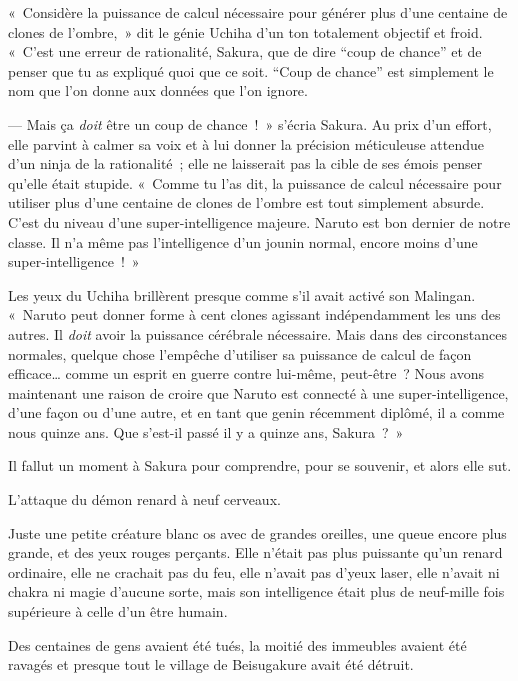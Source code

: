 \clearpage
{}

«~Considère la puissance de calcul nécessaire pour générer plus d'une centaine de clones de l'ombre,~» dit le génie Uchiha d'un ton totalement objectif et froid. «~C'est une erreur de rationalité, Sakura, que de dire “coup de chance” et de penser que tu as expliqué quoi que ce soit. “Coup de chance” est simplement le nom que l'on donne aux données que l'on ignore.

--- Mais ça \emph{doit} être un coup de chance~!~» s'écria Sakura. Au prix d'un effort, elle parvint à calmer sa voix et à lui donner la précision méticuleuse attendue d'un ninja de la rationalité~; elle ne laisserait pas la cible de ses émois penser qu'elle était stupide. «~Comme tu l'as dit, la puissance de calcul nécessaire pour utiliser plus d'une centaine de clones de l'ombre est tout simplement absurde. C'est du niveau d'une super-intelligence majeure. Naruto est bon dernier de notre classe. Il n'a même pas l'intelligence d'un jounin normal, encore moins d'une super-intelligence~!~»

Les yeux du Uchiha brillèrent presque comme s'il avait activé son Malingan. «~Naruto peut donner forme à cent clones agissant indépendamment les uns des autres. Il \emph{doit} avoir la puissance cérébrale nécessaire. Mais dans des circonstances normales, quelque chose l'empêche d'utiliser sa puissance de calcul de façon efficace… comme un esprit en guerre contre lui-même, peut-être~? Nous avons maintenant une raison de croire que Naruto est connecté à une super-intelligence, d'une façon ou d'une autre, et en tant que genin récemment diplômé, il a comme nous quinze ans. Que s'est-il passé il y a quinze ans, Sakura~?~»

Il fallut un moment à Sakura pour comprendre, pour se souvenir, et alors elle sut.

L'attaque du démon renard à neuf cerveaux.

Juste une petite créature blanc os avec de grandes oreilles, une queue encore plus grande, et des yeux rouges perçants. Elle n'était pas plus puissante qu'un renard ordinaire, elle ne crachait pas du feu, elle n'avait pas d'yeux laser, elle n'avait ni chakra ni magie d'aucune sorte, mais son intelligence était plus de neuf-mille fois supérieure à celle d'un être humain.

Des centaines de gens avaient été tués, la moitié des immeubles avaient été ravagés et presque tout le village de Beisugakure avait été détruit.

